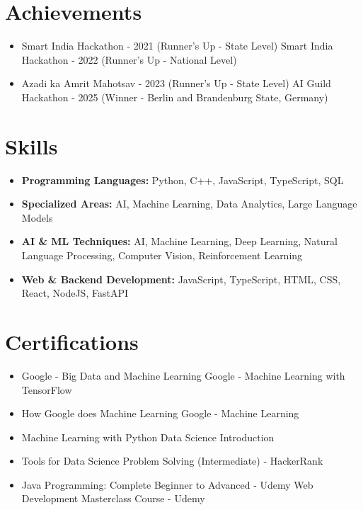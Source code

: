 \documentclass[a4paper,10pt]{article}
\begin{document}
\section*{Achievements}
\begin{itemize}
\item Smart India Hackathon - 2021 (Runner's Up - State Level) \hfill Smart India Hackathon - 2022 (Runner's Up - National Level)
\item Azadi ka Amrit Mahotsav - 2023 (Runner's Up - State Level) \hfill AI Guild Hackathon - 2025 (Winner - Berlin and Brandenburg State, Germany)
\end{itemize}

\section*{Skills}
\begin{itemize}
  \item \textbf{Programming Languages:} Python, C++, JavaScript, TypeScript, SQL
  \item \textbf{Specialized Areas:} AI, Machine Learning, Data Analytics, Large Language Models
  \item \textbf{AI \& ML Techniques:} AI, Machine Learning, Deep Learning, Natural Language Processing, Computer Vision, Reinforcement Learning
  \item \textbf{Web \& Backend Development:} JavaScript, TypeScript, HTML, CSS, React, NodeJS, FastAPI
\end{itemize}

\section*{Certifications}
\begin{itemize}
\item Google - Big Data and Machine Learning \hfill Google - Machine Learning with TensorFlow
\item How Google does Machine Learning \hfill Google - Machine Learning
\item Machine Learning with Python \hfill Data Science Introduction
\item Tools for Data Science \hfill Problem Solving (Intermediate) - HackerRank
\item Java Programming: Complete Beginner to Advanced - Udemy \hfill Web Development Masterclass Course - Udemy
\end{itemize}
\end{document}
